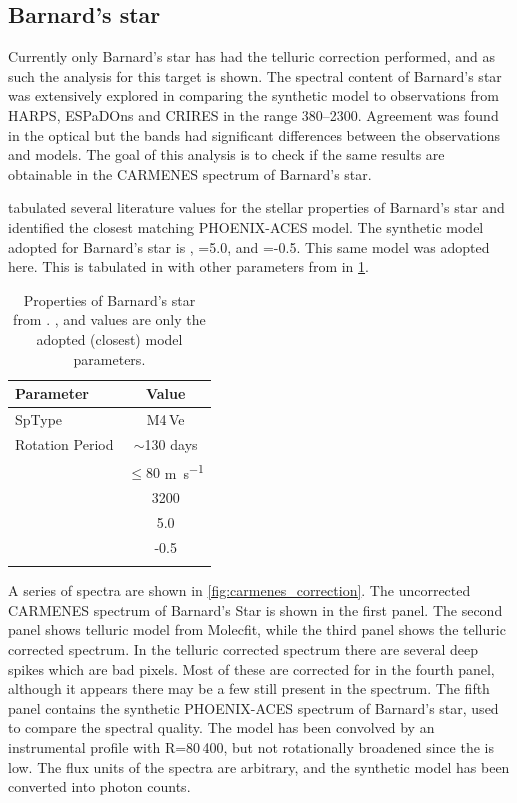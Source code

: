 \subsection{Barnard's star}
\label{sec:carmenes_barnards_star}
Currently only Barnard's star has had the telluric correction performed, and as such the analysis for this target is shown.
The spectral content of Barnard's star was extensively explored in \citet{artigau_optical_2018} comparing the synthetic model to observations from {HARPS}, {ESPaDOns} and {CRIRES} in the range 380--2300\nm{}.
Agreement was found in the optical but the \nir{} bands had significant differences between the observations and models. 
The goal of this analysis is to check if the same results are obtainable in the {CARMENES} spectrum of Barnard's star.

\citep{artigau_optical_2018} tabulated several literature values for the stellar properties of Barnard's star and identified the closest matching {PHOENIX-ACES} model.
The synthetic model adopted for Barnard's star is \K{}, \Logg{}=5.0, and \feh{}=-0.5.
This same model was adopted here.
This is tabulated in with other parameters from \citet{artigau_optical_2018} in \cref{tab:barnards_star_params}.

\begin{table}
    \centering
    \caption{Properties of Barnard's star from \citep{artigau_optical_2018}. \Teff{}, \feh{} and \Logg{} values are only the adopted (closest) model parameters.}
    \begin{tabular}{lc}
        \toprule
        Parameter & Value \\
        \midrule
        SpType & M4\,Ve \\
        Rotation Period & \(\sim\)130 days \\
        \Vsini{} & \(\le 80\) \si{\metre\per\second} \\
        \Teff{} & 3200 \K{} \\
        \Logg{} & 5.0 \\
        \feh{} & -0.5 \\
        \bottomrule{}
    \end{tabular}\label{tab:barnards_star_params}
\end{table}

A series of spectra are shown in \cref{fig:carmenes_correction}.
The uncorrected {CARMENES} spectrum of Barnard's Star is shown in the first panel.
The second panel shows telluric model from Molecfit, while the third panel shows the telluric corrected spectrum.
In the telluric corrected spectrum there are several deep spikes which are bad pixels.
Most of these are corrected for in the fourth panel, although it appears there may be a few still present in the spectrum.
The fifth panel contains the synthetic PHOENIX-ACES spectrum of Barnard's star, used to compare the spectral quality.
The model has been convolved by an instrumental profile with R=80\,400, but not rotationally broadened since the \Vsini{} is low. The flux units of the spectra are arbitrary, and the synthetic model has been converted into photon counts.


